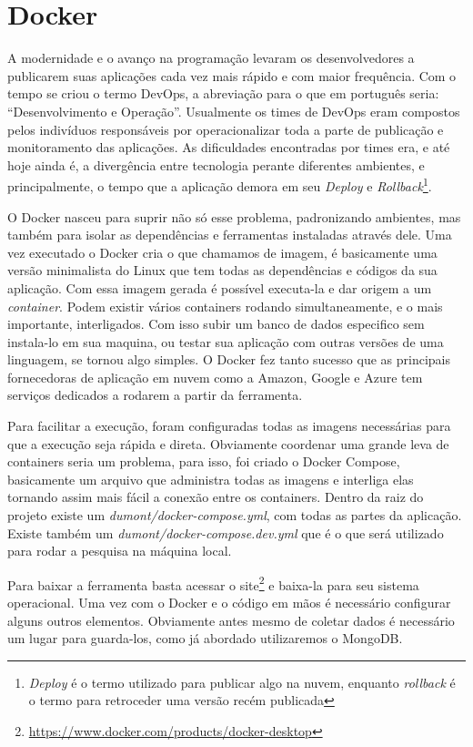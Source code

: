 \chapter{Docker}
\label{app:docker}

A modernidade e o avanço na programação levaram os desenvolvedores a publicarem suas aplicações cada vez mais rápido e com maior frequência. Com o tempo se criou o termo DevOps, a abreviação para o que em português seria: “Desenvolvimento e Operação”. Usualmente os times de DevOps eram compostos pelos indivíduos responsáveis por operacionalizar toda a parte de publicação e monitoramento das aplicações. As dificuldades encontradas por times era, e até hoje ainda é, a divergência entre tecnologia perante diferentes ambientes, e principalmente, o tempo que a aplicação demora em seu \textit{Deploy} e \textit{Rollback}\footnote{\textit{Deploy} é o termo utilizado para publicar algo na nuvem, enquanto \textit{rollback} é o termo para retroceder uma versão recém publicada}.

O Docker nasceu para suprir não só esse problema, padronizando ambientes, mas também para isolar as dependências e ferramentas instaladas através dele. Uma vez executado o Docker cria o que chamamos de imagem, é basicamente uma versão minimalista do Linux que tem todas as dependências e códigos da sua aplicação. Com essa imagem gerada é possível executa-la e dar origem a um \textit{container}. Podem existir vários containers rodando simultaneamente, e o mais importante, interligados. Com isso subir um banco de dados especifico sem instala-lo em sua maquina, ou testar sua aplicação com outras versões de uma linguagem, se tornou algo simples. O Docker fez tanto sucesso que as principais fornecedoras de aplicação em nuvem como a Amazon, Google e Azure tem serviços dedicados a rodarem a partir da ferramenta.

Para facilitar a execução, foram configuradas todas as imagens necessárias para que a execução seja rápida e direta. Obviamente coordenar uma grande leva de containers seria um problema, para isso, foi criado o Docker Compose, basicamente um arquivo que administra todas as imagens e interliga elas tornando assim mais fácil a conexão entre os containers. Dentro da raiz do projeto existe um \textit{dumont/docker-compose.yml}, com todas as partes da aplicação. Existe também um \textit{dumont/docker-compose.dev.yml} que é o que será utilizado para rodar a pesquisa na máquina local.

Para baixar a ferramenta basta acessar o site\footnote{\url{https://www.docker.com/products/docker-desktop}} e baixa-la para seu sistema operacional. Uma vez com o Docker e o código em mãos é necessário configurar alguns outros elementos. Obviamente antes mesmo de coletar dados é necessário um lugar para guarda-los, como já abordado utilizaremos o MongoDB.

